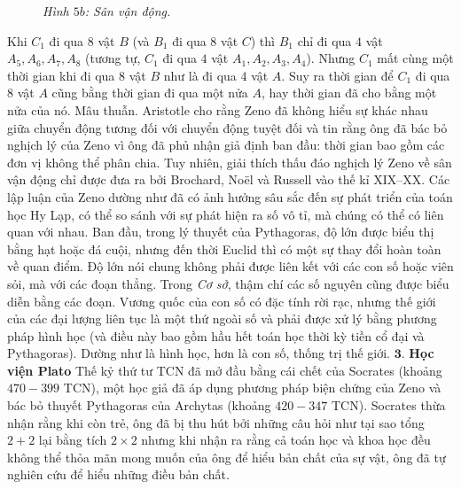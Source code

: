 \begin{multicols}{2}
\begin{figure}[H]
	\caption{\small\textit{\color{lichsutoanhoc}Hình $5b$: Sân vận động.}}
	\vspace*{-10pt}
	\end{figure}
	Khi $C_1$  đi qua $8$ vật $B$  (và $B_1$ đi qua 8 vật  $C$) thì $B_1$  chỉ đi qua $4$ vật $A_5, A_6, A_7, A_8$  (tương tự,  $C_1$  đi qua $4$ vật  $A_1, A_2, A_3, A_4$). Nhưng $C_1$  mất cùng một thời gian khi đi qua $8$ vật  $B$ như là đi qua $4$ vật $A$.  Suy ra thời gian để  $C_1$  đi qua $8$ vật $A$  cũng bằng thời gian đi qua một nửa $A$,  hay thời gian đã cho bằng một nửa của nó. Mâu thuẫn.     
	\vskip 0.1cm
	Aristotle cho rằng Zeno đã không hiểu sự khác nhau giữa chuyển động tương đối với chuyển động tuyệt đối và tin rằng ông đã bác bỏ nghịch lý của Zeno vì ông đã phủ nhận giả định ban đầu: thời gian bao gồm các đơn vị không thể phân chia. Tuy nhiên, giải thích thấu đáo nghịch lý Zeno về sân vận động chỉ được đưa ra bởi Brochard, Noël và Russell vào thế kỉ XIX--XX.
	\vskip 0.1cm 
	Các lập luận của Zeno dường như đã có ảnh hưởng sâu sắc đến sự phát triển của toán học Hy Lạp, có thể so sánh với sự phát hiện ra số vô tỉ, mà chúng có thể có liên quan với nhau. Ban đầu, trong lý thuyết của Pythagoras, độ lớn được biểu thị bằng hạt hoặc đá cuội, nhưng đến thời Euclid thì có một sự thay đổi hoàn toàn về quan điểm.  Độ lớn nói chung không phải được liên kết với các con số hoặc viên sỏi, mà với các đoạn thẳng. Trong \textit{Cơ sở}, thậm chí các số nguyên cũng được biểu diễn bằng các đoạn. Vương quốc của con số có đặc tính rời rạc, nhưng thế giới của các đại lượng liên tục là một thứ ngoài số và phải được xử lý bằng phương pháp hình học (và điều này bao gồm hầu hết toán học thời kỳ tiền cổ đại và Pythagoras).  Dường như là hình học, hơn là con số, thống trị thế giới.
	\vskip 0.1cm
	$\pmb{3.}$ \textbf{\color{lichsutoanhoc}Học viện Plato}
	\vskip 0.1cm
	Thế kỷ thứ tư TCN đã mở đầu bằng cái chết của Socrates (khoảng $470-399$ TCN), một học giả đã áp dụng phương pháp biện chứng của Zeno và bác bỏ thuyết Pythagoras của Archytas (khoảng $420-347$ TCN). Socrates thừa nhận rằng khi còn trẻ, ông đã bị thu hút bởi những câu hỏi như tại sao tổng $2 + 2$ lại bằng tích $2 \times 2$  nhưng khi nhận ra rằng cả toán học và khoa học đều không thể thỏa mãn mong muốn của ông để  hiểu bản chất của sự vật, ông đã tự nghiên cứu để hiểu những điều bản chất.
	\end{multicols}
